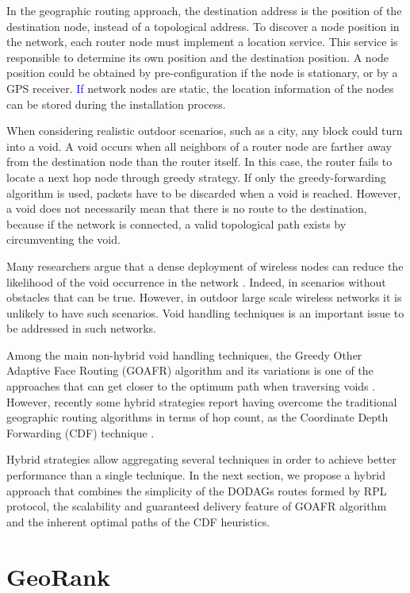 \documentclass[final,authoryear,3p,twocolumn]{elsarticle}
\newcommand{\removed}[1]{}
\newcommand{\rev}{\textcolor{blue}}
\begin{document}
In the geographic routing approach, the destination address is the position of the destination node, instead of a topological address. To discover a node position in the network, each router node must implement a location service. This service is responsible to determine its own position and the destination position. A node position could be obtained by pre-configuration if the node is stationary, or by a GPS receiver. \removed{As}\rev{If} network nodes are static\removed{in the street lighting case}, the location information of the nodes can be stored during the installation process. 

When considering realistic outdoor scenarios, such as a city, any block could turn into a void. A void occurs when all neighbors of a router node are farther away from the destination node than the router itself. In this case, the router fails to locate a next hop node through greedy strategy. If only the greedy-forwarding algorithm is used, packets have to be discarded when a void is reached. However, a void does not necessarily mean that there is no route to the destination, because if the network is connected, a valid topological path exists by circumventing the void. 

Many researchers argue that a dense deployment of wireless nodes can reduce the likelihood of the void occurrence in the network \citep{WSN_routing, survey_2007}. Indeed, in scenarios without obstacles that can be true. However, in outdoor large scale wireless networks it is unlikely to have such scenarios. Void handling techniques is an important issue to be addressed in such networks. 

Among the main non-hybrid void handling techniques, the Greedy Other Adaptive Face Routing (GOAFR) algorithm and its variations is one of the approaches that can get closer to the optimum path when traversing voids \citep{GOAFR_2008}. However, recently some hybrid strategies report having overcome the traditional geographic routing algorithms in terms of hop count, as the Coordinate Depth Forwarding (CDF) technique \citep{Denardin2011}.

Hybrid strategies allow aggregating several techniques in order to achieve better performance than a single technique. In the next section, we propose a hybrid approach that combines the simplicity of the DODAGs routes formed by RPL protocol, the scalability and guaranteed delivery feature of GOAFR algorithm and the inherent optimal paths of the CDF heuristics.

\section{GeoRank}
\label{secGeoRank}
\end{document}
